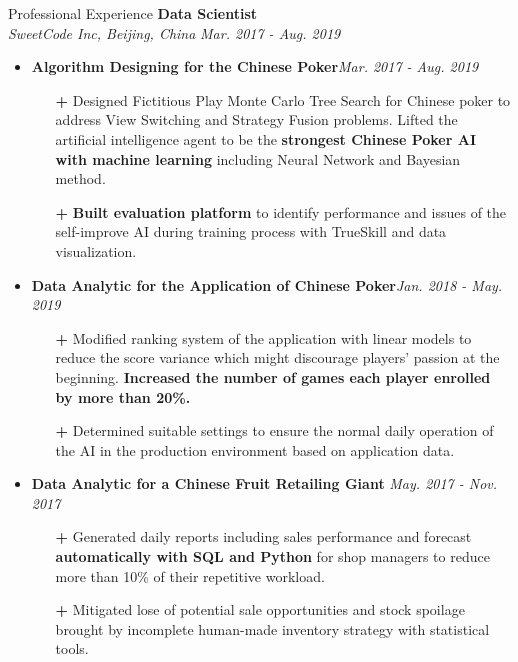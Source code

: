 \documentclass{resume} %
\begin{document}
\begin{rSection}{Professional Experience}
{\bf Data Scientist}
\\ {\em SweetCode Inc, Beijing, China} \hfill {\em Mar. 2017 - Aug. 2019}
\begin{itemize}
\setlength{\parskip}{0.5pt}
    \item {\bf Algorithm Designing for the Chinese Poker}\hfill{\em Mar. 2017 - Aug. 2019}
    \begin{itemize}
    \setlength{\parskip}{0.3pt}
        \item[\textbf{+}] Designed Fictitious Play Monte Carlo Tree Search for Chinese poker to address View Switching and Strategy Fusion problems. Lifted the artificial intelligence agent to be the \textbf{strongest Chinese Poker AI with machine learning} including Neural Network and Bayesian method.
        \item[\textbf{+}] \textbf{Built evaluation platform} to identify performance and issues of the self-improve AI during training process with TrueSkill and data visualization.
\end{itemize}

    \item {\bf Data Analytic for the Application of Chinese Poker}\hfill{\em Jan. 2018 - May. 2019}
    \begin{itemize}
        \item[\textbf{+}] Modified ranking system of the application with linear models to reduce the score variance which might discourage players' passion at the beginning. \textbf{Increased the number of games each player enrolled by more than 20\%.}
        \item[\textbf{+}] Determined suitable settings to ensure the normal daily operation of the AI in the production environment based on application data.

\end{itemize}
\item {\bf Data Analytic for a Chinese Fruit Retailing Giant} \hfill{\em May. 2017 - Nov. 2017}
\begin{itemize}
\setlength{\parskip}{0.2pt}
\item[\textbf{+}] Generated daily reports including sales performance and forecast \textbf{automatically with SQL and Python} for shop managers to reduce more than 10\% of their repetitive workload.
\item[\textbf{+}] Mitigated lose of potential sale opportunities and stock spoilage brought by incomplete human-made inventory strategy with statistical tools.
\end{itemize}
\end{itemize}
\end{rSection}
\end{document}
